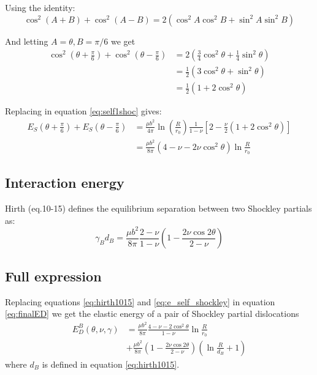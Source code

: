 \documentclass[10pt,a4paper,final]{article}
\begin{document}
Using the identity: 
\begin{equation}
\cos^2(A+B) + \cos^2(A-B) = 2(\cos^2A\cos^2B + \sin^2A\sin^2B) \label{eqcosplus}
\end{equation}

And letting $A = \theta, B = \pi/6$ we get
\begin{subequations}
\begin{align*}
\cos^2\left(\theta+\frac{\pi}{6}\right) + \cos^2\left(\theta-\frac{\pi}{6}\right) &= 
2\left(\frac{3}{4}\cos^2\theta + \frac{1}{4}\sin^2\theta \right) \\
&= \frac{1}{2}(3\cos^2\theta + \sin^2\theta) \\
&= \frac{1}{2}(1+2\cos^2\theta)
\end{align*}
\end{subequations}

Replacing in equation \ref{eq:self1shoc} gives:
\begin{equation}
\begin{split}
E_S\left(\theta+\frac{\pi}{6}\right) + E_S\left(\theta-\frac{\pi}{6}\right) &=
\frac{\mu b^2}{4\pi}\ln\left(\frac{R}{r_0}\right)\frac{1}{1-\nu}\left[2-\frac{\nu}{2}(1+2\cos^2\theta)\right] \\
&=\frac{\mu b^2}{8\pi}(4-\nu-2\nu\cos^2\theta)\ln\frac{R}{r_0} \label{eq:e_self_shockley}
\end{split}
\end{equation}

\subsection{Interaction energy}
Hirth \cite{hirth1982theory}(eq.10-15) defines the equilibrium separation between two Shockley partials as:
\begin{equation}
\gamma_B d_B = \frac{\mu b^2}{8\pi}\frac{2-\nu}{1-\nu}\left(1-\frac{2\nu\cos2\theta}{2-\nu}\right)
\label{eq:hirth1015}
\end{equation}

\subsection{Full expression}
Replacing equations \ref{eq:hirth1015} and \ref{eq:e_self_shockley} in equation \ref{eq:finalED} we get the elastic energy of a pair of Shockley partial dislocations
\begin{equation}
\begin{split}
E_D^B(\theta,\nu,\gamma) &= \frac{\mu b^2}{8\pi}\frac{4-\nu-2\cos^2\theta}{1-\nu}\ln\frac{R}{r_0} \\ 
&+\frac{\mu b^2}{8\pi}\left(1-\frac{2\nu\cos2\theta}{2-\nu}\right)\left(\ln\frac{R}{d_B} + 1 \right)
\end{split}
\label{eq:EDshoc}
\end{equation}
where $d_B$ is defined in equation \ref{eq:hirth1015}.
\end{document}
